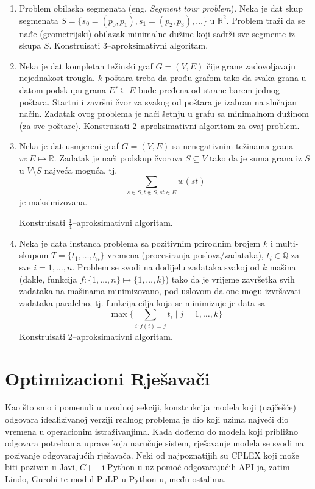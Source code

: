 \documentclass[a4paper, utf8, 11pt, colorlinks]{book}
\theoremstyle{definition}
\begin{document}
\begin{enumerate}
		 \item %
		 Problem obilaska segmenata (eng. \emph{Segment tour problem}). Neka je dat skup segmenata $S = \{s_0 = (p_0, p_1), s_1 =(p_2, p_3),\ldots\}$ u $\mathbb{R}^2$. Problem traži da se nađe (geometrijski) obilazak minimalne dužine koji sadrži sve segmente iz skupa $S$. Konstruisati 3--aproksimativni algoritam.  
		 \item Neka je dat kompletan težinski graf $G=(V,E)$ čije grane zadovoljavaju nejednakost trougla. $ k$ poštara treba da prođu grafom tako da svaka grana u datom podskupu grana $E' \subseteq E$ bude pređena  od strane barem jednog poštara. Startni i završni čvor za svakog od poštara je izabran na slučajan način. Zadatak ovog problema je naći šetnju u grafu sa minimalnom dužinom (za sve poštare). 
		 Konstruisati 2--aproksimativni algoritam za ovaj problem. 
		 \item %
		 Neka je dat usmjereni graf $G = (V,E) $ sa nenegativnim težinama grana $w:E\mapsto\mathbb{R}$. Zadatak je naći  podskup čvorova $S \subseteq V$ tako da je suma grana iz $S$ u $V\setminus S$ najveća moguća, tj. 
		  $$ \sum_{s \in S, t \notin S, st \in E }w(st)$$
		  je maksimizovana.  
		  
		  Konstruisati $\frac{1}{4}$--aproksimativni algoritam.
		 \item  %
		 Neka je data instanca problema sa pozitivnim prirodnim  brojem $k$ i multi-skupom 
		 $T = \{t_1,\ldots, t_n\}$ vremena (procesiranja poslova/zadataka), $t_i \in \mathbb{Q}$ za sve $i=1,\ldots, n$. 
		 Problem se svodi na dodijelu zadataka svakoj od $k$ mašina (dakle, funkcija $f:\{1,\ldots, n\} \mapsto \{1,\ldots, k\}$) tako da je vrijeme završetka svih zadataka na mašinama minimizovano, pod uslovom da one mogu izvršavati zadataka paralelno, tj. funkcija cilja koja se minimizuje je data sa 
		 $$\max \{\sum_{i: f(i) = j } t_i \mid j=1,\ldots, k \}$$
		 Konstruisati 2--aproksimativni algoritam.
\end{enumerate}



 \chapter{Optimizacioni Rješavači}
 
 Kao što smo i pomenuli u uvodnoj sekciji, konstrukcija modela koji (najčešće) odgovara idealizivanoj verziji realnog problema je 
 dio koji uzima najveći dio vremena u operacionim istraživanjima. Kada dođemo do modela koji približno odgovara potrebama uprave koja naručuje sistem, rješavanje modela se svodi na pozivanje odgovarajućih rješavača. Neki od najpoznatijih su 
 CPLEX koji može biti pozivan u Javi, $C$++ i Python-u uz pomoć odgovarajućih API-ja, zatim Lindo, Gurobi te modul PuLP u Python-u, među ostalima.  
 
\end{document}
